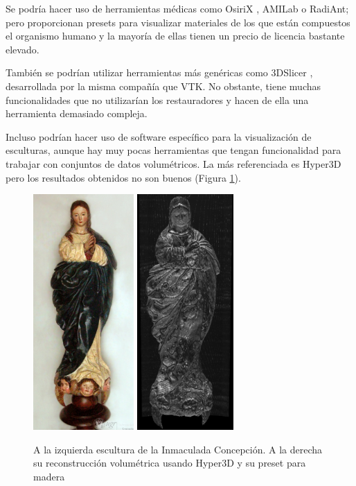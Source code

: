 Se podría hacer uso de herramientas médicas como OsiriX \cite{osirix}, AMILab \cite{amilab} o RadiAnt; pero proporcionan presets para visualizar materiales de los que están compuestos el organismo humano y la mayoría de ellas tienen un precio de licencia bastante elevado.

También se podrían utilizar herramientas más genéricas como 3DSlicer \cite{slicer}, desarrollada por la misma compañía que VTK. No obstante, tiene muchas funcionalidades que no utilizarían los restauradores y hacen de ella una herramienta demasiado compleja.

Incluso podrían hacer uso de software específico para la visualización de esculturas, aunque hay muy pocas herramientas que tengan funcionalidad para trabajar con conjuntos de datos volumétricos. La más referenciada es Hyper3D \cite{hyper3d} pero los resultados obtenidos no son buenos (Figura \ref{fig:hyper3d_results}).

\begin{figure}[H]
	\centering
	\includegraphics[height=9cm]{imagenes/inmaculada_concepcion_real}
	\includegraphics[height=9cm]{imagenes/inmaculada_concepcion_hyper3d}
	\caption{A la izquierda escultura de la Inmaculada Concepción. A la derecha su reconstrucción volumétrica usando Hyper3D y su preset para madera}
	\label{fig:hyper3d_results}
\end{figure}

